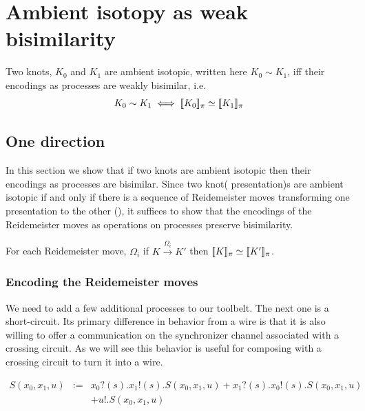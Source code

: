 \documentclass[]{llncs}
\begin{document}
\section{Ambient isotopy as weak bisimilarity} \label{MainThm}

\begin{theorem}[main]
  Two knots, $K_0$ and $K_1$ are ambient isotopic, written here $K_0
  \sim K_1$, iff their encodings as processes are weakly bisimilar,
  i.e.
  \begin{equation}
    K_0 \sim K_1 \iff [\![ K_0 ]\!]_{\pi} \simeq [\![ K_1 ]\!]_{\pi}
  \end{equation}
\end{theorem}

\subsection{One direction}

In this section we show that if two knots are ambient isotopic then
their encodings as processes are bisimilar. Since two knot(
presentation)s are ambient isotopic if and only if there is a sequence
of Reidemeister moves transforming one presentation to the other
(\cite{sossinskyknotsandbraids}), it suffices to show that the
encodings of the Reidemeister moves as operations on processes
preserve bisimilarity.

\begin{lemma} For each Reidemeister move, $\Omega_i$ if $K
  \stackrel{\Omega_i}{\longrightarrow} K'$ then $[\![ K ]\!]_{\pi} \simeq [\![ K' ]\!]_{\pi}$.
\end{lemma}

\subsubsection{Encoding the Reidemeister moves}

We need to add a few additional processes to our toolbelt. The next
one is a short-circuit. Its primary difference in behavior from a wire
is that it is also willing to offer a communication on the
synchronizer channel associated with a crossing circuit. As we will
see this behavior is useful for composing with a crossing circuit to
turn it into a wire.

\begin{eqnarray}
  S(x_0,x_1,u) & := & x_0?(s).x_1!(s).S(x_0,x_1,u) + x_1?(s).x_0!(s).S(x_0,x_1,u) \nonumber \\
  & & + u!.S(x_0,x_1,u)
\end{eqnarray}
\end{document}
